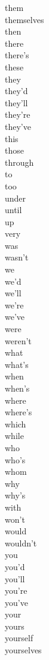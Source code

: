 \begin{appendices}
\begin{multicols}{7}
them\\
themselves\\
then\\
there\\
there's\\
these\\
they\\
they'd\\
they'll\\
they're\\
they've\\
this\\
those\\
through\\
to\\
too\\
under\\
until\\
up\\
very\\
was\\
wasn't\\
we\\
we'd\\
we'll\\
we're\\
we've\\
were\\
weren't\\
what\\
what's\\
when\\
when's\\
where\\
where's\\
which\\
while\\
who\\
who's\\
whom\\
why\\
why's\\
with\\
won't\\
would\\
wouldn't\\
you\\
you'd\\
you'll\\
you're\\
you've\\
your\\
yours\\
yourself\\
yourselves\\

\end{multicols}
\end{appendices}
